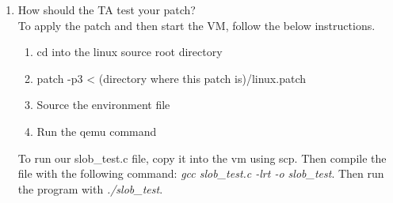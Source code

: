\documentclass[letterpaper,10pt,draftclsnofoot,onecolumn,titlepage]{IEEEtran}
\begin{document}
\begin{enumerate}
		\item How should the TA test your patch? \\
To apply the patch and then start the VM, follow the below instructions. 

	\begin{enumerate}
		\item cd into the linux source root directory
		\item patch -p3 < (directory where this patch is)/linux.patch
		\item Source the environment file 
		\item Run the qemu command
	\end{enumerate} 
To run our slob\_test.c file, copy it into the vm using scp. 
Then compile the file with the following command: \textit{gcc slob\_test.c -lrt -o slob\_test}.
Then run the program with \textit{./slob\_test}.
 

\end{enumerate}
\end{document}
